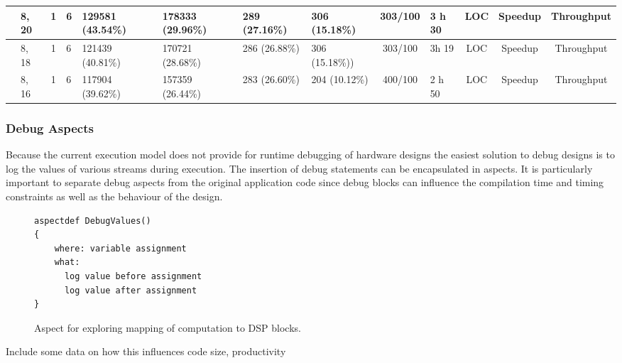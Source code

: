 \begin{table}
\begin{tabular}{ p{2cm}  | p{1cm} | c|  p{1cm} |  p{1cm} | p{1cm} |   p{1cm} |  p{1cm} | c | p{1cm} |c | c | c}
                                     & 8, 20      & 1     & 6   & 129581  (43.54\%) & 178333  (29.96\%) & 289  (27.16\%)       & 306  (15.18\%)  & 303/100   & 3 h 30       & LOC & Speedup & Throughput \\ \hline
                                     & 8, 18      & 1     & 6   & 121439  (40.81\%) & 170721  (28.68\%) & 286  (26.88\%)       & 306  (15.18\%)) & 303/100   & 3h 19        & LOC & Speedup & Throughput \\
                                     & 8, 16      & 1   & 6   & 117904  (39.62\%) & 157359  (26.44\%) & 283  (26.60\%)       & 204  (10.12\%)  & 400/100   & 2 h 50       & LOC & Speedup & Throughput \\ \hline

   \end{tabular}
\end{table}

\subsubsection{Debug Aspects}

Because the current execution model does not provide for runtime
debugging of hardware designs the easiest solution to debug designs is
to log the values of various streams during execution. The insertion
of debug statements can be encapsulated in aspects. It is particularly
important to separate debug aspects from the original application code
since debug blocks can influence the compilation time and timing
constraints as well as the behaviour of the design.

\lstset{style=aspectp}
\begin{figure}[!h]
\centering
\begin{lstlisting}
aspectdef DebugValues()
{
    where: variable assignment
    what:
      log value before assignment
      log value after assignment
}
\end{lstlisting}
\caption{Aspect for exploring mapping of computation to DSP blocks.}
\label{fig:aspect-DSP}
\end{figure}


\TODO Include some data on how this influences code size,
  productivity

